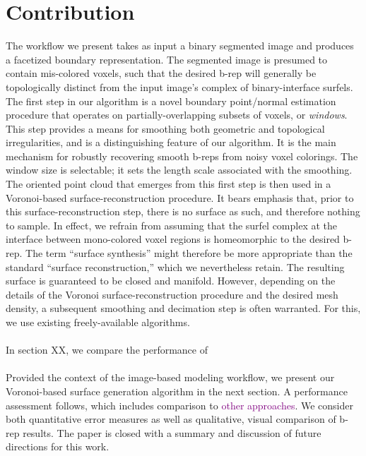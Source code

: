 \section{Contribution}

The workflow we present takes as input a binary segmented image and produces a facetized boundary representation.  The segmented image is presumed to contain mis-colored voxels, such that the desired b-rep will generally be topologically distinct from the input image's complex of binary-interface surfels.  The first step in our algorithm is a novel boundary point/normal estimation procedure that operates on partially-overlapping subsets of voxels, or {\em windows}.  This step provides a means for smoothing both geometric and topological irregularities, and is a distinguishing feature of our algorithm.  It is the main mechanism for robustly recovering smooth b-reps from noisy voxel colorings.  The window size is selectable; it sets the length scale associated with the smoothing.  The oriented point cloud that emerges from this first step is then used in a Voronoi-based surface-reconstruction procedure.  It bears emphasis that, prior to this surface-reconstruction step, there is no surface as such, and therefore nothing to sample.  In effect, we refrain from assuming that the surfel complex at the interface between mono-colored voxel regions is homeomorphic to the desired b-rep.  The term ``surface synthesis'' might therefore be more appropriate than the standard ``surface reconstruction,'' which we nevertheless retain. The resulting surface is guaranteed to be closed and manifold.  However, depending on the details of the Voronoi surface-reconstruction procedure and the desired mesh density, a subsequent smoothing and decimation step is often warranted.  For this, we use existing freely-available algorithms. \\ \\
%
In section XX, we compare the performance of \\ \\
%
Provided the context of the image-based modeling workflow, we present our Voronoi-based surface generation algorithm in the next section. A performance assessment follows, which includes comparison to \textcolor{purple}{other approaches}.  We consider both quantitative error measures as well as qualitative, visual comparison of b-rep results.  The paper is closed with a summary and discussion of future directions for this work.